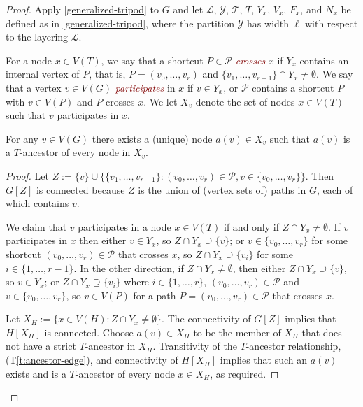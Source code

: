 \documentclass{patmorin}
\newcommand{\defin}[1]{\textcolor{Maroon}{\emph{#1}}}
\newcommand{\tref}[1]{(T\ref{t:#1})}
\newcommand{\PP}{\mathcal{P}}
\begin{document}
\begin{proof}
Apply \cref{generalized-tripod} to $G$ and let $\mathcal{L}$, $\mathcal{Y}$, $\mathcal{T}$, $T$, $Y_x$, $V_x$, $F_x$, and $N_x$ be defined as in \cref{generalized-tripod}, where the partition $\mathcal{Y}$ has width $\ell$ with respect to the layering $\mathcal{L}$.

For a node $x\in V(T)$, we say that a shortcut $P\in\mathcal{P}$ \defin{crosses} $x$ if $Y_x$ contains an internal vertex of $P$, that is, $P=(v_0,\ldots,v_r)$ and $\{v_1,\ldots,v_{r-1}\}\cap Y_x\neq\emptyset$.  We say that a vertex $v\in V(G)$ \defin{participates} in $x$ if $v\in Y_x$, or $\mathcal{P}$ contains a shortcut $P$ with $v\in V(P)$ and $P$ crosses $x$. We let $X_v$ denote the set of nodes $x\in V(T)$ such that $v$ participates in $x$.

\begin{clm}\label{x-v-ancestor}
  For any $v\in V(G)$ there exists a (unique) node $a(v)\in X_v$ such that
  $a(v)$ is a $T$-ancestor of every node in $X_v$.
\end{clm}

\begin{proof}
  Let $Z := \{v\} \cup \{\{v_1,\ldots,v_{r-1}\}:(v_0,\ldots,v_r)\in\mathcal{P}, v\in \{v_0,\ldots,v_r\}\}$. Then $G[Z]$ is connected because $Z$ is the union of (vertex sets of) paths in $G$, each of which contains $v$.

  We claim that $v$ participates in a node $x\in V(T)$ if and only if $Z\cap Y_x\neq\emptyset$.  If $v$ participates in $x$ then either $v\in Y_x$, so $Z\cap Y_x\supseteq\{v\}$; or $v\in \{v_0,\ldots,v_r\}$ for some shortcut $(v_0,\ldots,v_r)\in\mathcal{P}$ that crosses $x$, so $Z\cap Y_x\supseteq \{v_i\}$ for some $i\in\{1,\ldots,r-1\}$.  In the other direction, if $Z\cap Y_x\neq\emptyset$, then either $Z\cap Y_x\supseteq \{v\}$, so $v\in Y_x$; or $Z\cap Y_x\supseteq \{v_i\}$ where $i\in\{1,\ldots,r\}$, $(v_0,\ldots,v_r)\in\PP$ and $v\in\{v_0,\ldots,v_r\}$, so $v\in V(P)$ for a path $P=(v_0,\ldots,v_r)\in\mathcal{P}$ that crosses $x$.

  Let $X_H:=\{x\in V(H): Z\cap Y_x\neq\emptyset\}$.  The connectivity of $G[Z]$ implies that $H[X_H]$ is connected.
  Choose $a(v)\in X_H$ to be the member of $X_H$ that does not have a strict $T$-ancestor in $X_H$.  Transitivity of the $T$-ancestor relationship, \tref{ancestor-edge}, and connectivity of $H[X_H]$ implies that such an $a(v)$ exists and is a $T$-ancestor of every node $x\in X_H$, as required.
\end{proof}


\end{proof}
\end{document}
